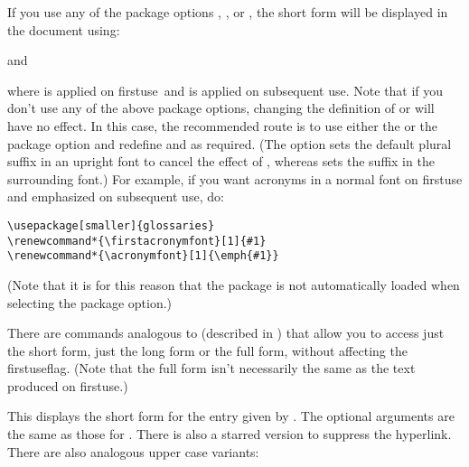 \documentclass[report]{nlctdoc}
\newcommand*{\firstuse}{\gls{firstuse}}
\begin{document}
If you use any of the package options ,
,  or , the
short form  will be displayed in the document using:
\begin{definition}[\DescribeMacro{\acronymfont}]
\end{definition}
and
\begin{definition}[\DescribeMacro{\firstacronymfont}]
\end{definition}
where  is applied on \firstuse\ and
 is applied on subsequent use. Note that if you
don't use any of the above package options, changing the definition
of  or  will have no effect. In
this case, the recommended route is to use either the
 or the  package option and
redefine  and  as required.
(The  option sets the default plural suffix in an
upright font to cancel the effect of , whereas
 sets the suffix in the surrounding font.) For
example, if you want acronyms in a normal font on \gls{firstuse} and
emphasized on subsequent use, do:
\begin{verbatim}
\usepackage[smaller]{glossaries}
\renewcommand*{\firstacronymfont}[1]{#1}
\renewcommand*{\acronymfont}[1]{\emph{#1}}
\end{verbatim}
(Note that it is for this reason that the  package is
not automatically loaded when selecting the  package
option.)

There are commands analogous to  (described in
) that allow you to access just the short
form, just the long form or the full form, without affecting the
\gls{firstuseflag}. (Note that the full form isn't necessarily the same
as the text produced on \firstuse.)

\begin{definition}[\DescribeMacro{\acrshort}]
\end{definition}
This displays the short form for the entry given by .
The optional arguments are the same as those for .
There is also a starred version to suppress the hyperlink. There are
also analogous upper case variants:
\begin{definition}[\DescribeMacro{\Acrshort}]
\end{definition}
\begin{definition}[\DescribeMacro{\ACRshort}]
\end{definition}
\end{document}
